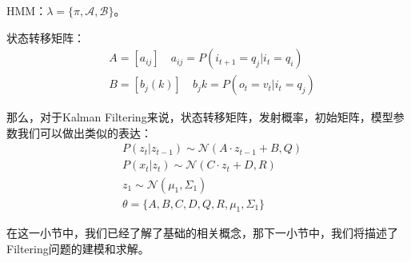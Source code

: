 \documentclass[a4paper]{article}
\begin{document}
HMM：$\lambda=\{ \pi,\mathcal{A},\mathcal{B} \}$。

状态转移矩阵：
\begin{equation}
    \begin{split}
        & A=[a_{ij}] \quad a_{ij} = P(i_{t+1}=q_j|i_t=q_i) \\
        & B=[b_j(k)] \quad b_j{k} = P(o_t=v_t|i_t=q_j)
    \end{split}
\end{equation}

那么，对于Kalman Filtering来说，状态转移矩阵，发射概率，初始矩阵，模型参数我们可以做出类似的表达：
\begin{align}
    & P(z_t|z_{t-1}) \sim \mathcal{N}(A\cdot z_{t-1} + B, Q) \\
    & P(x_t|z_{t}) \sim \mathcal{N}(C\cdot z_{t} + D, R) \\
    & z_1 \sim \mathcal{N}(\mu_1,\Sigma_1) \\
    & \theta = \{ A, B, C, D, Q, R, \mu_1, \Sigma_1 \}
\end{align}

在这一小节中，我们已经了解了基础的相关概念，那下一小节中，我们将描述了Filtering问题的建模和求解。
\end{document}
